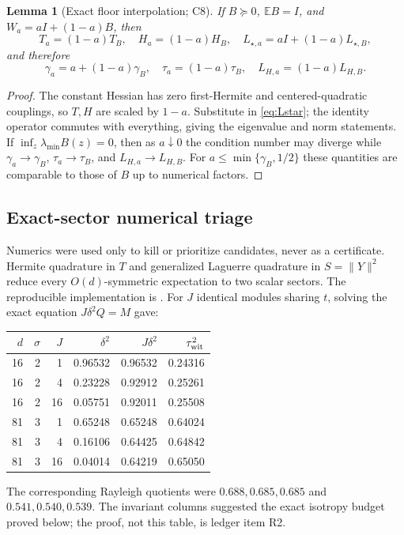 \documentclass[11pt]{article}
\numberwithin{equation}{section}
\newtheorem{lemma}[theorem]{Lemma}
\newcommand{\E}{\mathbb E}
\begin{document}
\begin{lemma}[Exact floor interpolation; C8]\label{lem:floor-interpolation}
If $B\succeq0$, $\E B=I$, and
$W_a=aI+(1-a)B$, then
\begin{equation}\label{eq:floor-interpolation}
 T_a=(1-a)T_B,\quad H_a=(1-a)H_B,\quad
 L_{\star,a}=aI+(1-a)L_{\star,B},
\end{equation}
and therefore
\begin{equation}\label{eq:floor-spectral}
 \gamma_a=a+(1-a)\gamma_B,\quad
 \tau_a=(1-a)\tau_B,\quad
 L_{H,a}=(1-a)L_{H,B}.
\end{equation}
\end{lemma}

\begin{proof}
The constant Hessian has zero first-Hermite and centered-quadratic
couplings, so $T,H$ are scaled by $1-a$.  Substitute in
\eqref{eq:Lstar}; the identity operator commutes with everything, giving
the eigenvalue and norm statements.  If
$\inf_z\lambda_{\min}B(z)=0$, then as $a\downarrow0$ the condition number
may diverge while $\gamma_a\to\gamma_B$, $\tau_a\to\tau_B$, and
$L_{H,a}\to L_{H,B}$.  For $a\le\min\{\gamma_B,1/2\}$ these quantities are
comparable to those of $B$ up to numerical factors.
\end{proof}

\subsection{Exact-sector numerical triage}\label{sec:quadrature}

Numerics were used only to kill or prioritize candidates, never as a
certificate.  Hermite quadrature in $T$ and generalized Laguerre quadrature
in $S=\|Y\|^2$ reduce every $O(d)$-symmetric expectation to two scalar
sectors.  The reproducible implementation is
.
For $J$ identical modules sharing $t$, solving the exact equation
$J\delta^2Q=M$ gave:
\begin{center}
\begin{tabular}{rrrrrr}
\toprule
$d$&$\sigma$&$J$&$\delta^2$&$J\delta^2$&$\tau_{\rm wit}^2$\\
\midrule
16&2&1&0.96532&0.96532&0.24316\\
16&2&4&0.23228&0.92912&0.25261\\
16&2&16&0.05751&0.92011&0.25508\\
81&3&1&0.65248&0.65248&0.64024\\
81&3&4&0.16106&0.64425&0.64842\\
81&3&16&0.04014&0.64219&0.65050\\
\bottomrule
\end{tabular}
\end{center}
The corresponding Rayleigh quotients were $0.688,0.685,0.685$ and
$0.541,0.540,0.539$.  The invariant columns suggested the exact isotropy
budget proved below; the proof, not this table, is ledger item R2.
\end{document}
